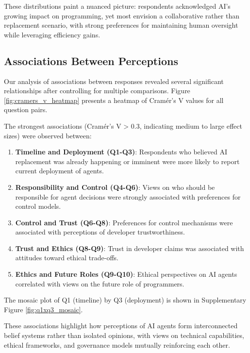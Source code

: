 \documentclass{article}
\begin{document}
These distributions paint a nuanced picture: respondents acknowledged
AI's growing impact on programming, yet most envision a collaborative
rather than replacement scenario, with strong preferences for
maintaining human oversight while leveraging efficiency gains.

\subsection{Associations Between
	Perceptions}\label{associations-between-perceptions}

Our analysis of associations between responses revealed several
significant relationships after controlling for multiple comparisons.
Figure \ref{fig:cramers_v_heatmap} presents a heatmap of Cramér's V
values for all question pairs.

The strongest associations (Cramér's V \textgreater{} 0.3, indicating
medium to large effect sizes) were observed between:

\begin{enumerate}
	\def\labelenumi{\arabic{enumi}.}
	\item
	      \textbf{Timeline and Deployment (Q1-Q3)}: Respondents who believed AI
	      replacement was already happening or imminent were more likely to
	      report current deployment of agents.
	\item
	      \textbf{Responsibility and Control (Q4-Q6)}: Views on who should be
	      responsible for agent decisions were strongly associated with
	      preferences for control models.
	\item
	      \textbf{Control and Trust (Q6-Q8)}: Preferences for control mechanisms
	      were associated with perceptions of developer trustworthiness.
	\item
	      \textbf{Trust and Ethics (Q8-Q9)}: Trust in developer claims was
	      associated with attitudes toward ethical trade-offs.
	\item
	      \textbf{Ethics and Future Roles (Q9-Q10)}: Ethical perspectives on AI
	      agents correlated with views on the future role of programmers.
\end{enumerate}

The mosaic plot of Q1 (timeline) by Q3 (deployment) is shown in
Supplementary Figure \ref{fig:q1xq3_mosaic}.

These associations highlight how perceptions of AI agents form
interconnected belief systems rather than isolated opinions, with views
on technical capabilities, ethical frameworks, and governance models
mutually reinforcing each other.
\end{document}
